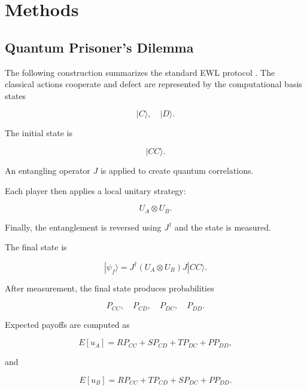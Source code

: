 \section{Methods}

\subsection{Quantum Prisoner's Dilemma}

The following construction summarizes the standard EWL protocol \cite{ewl}. The classical actions cooperate and defect are represented by the computational basis states

\begin{equation}
	|C\rangle,\quad |D\rangle.
\end{equation}

The initial state is

\begin{equation}
	|CC\rangle.
\end{equation}

An entangling operator $J$ is applied to create quantum correlations.

Each player then applies a local unitary strategy:

\begin{equation}
	U_A \otimes U_B.
\end{equation}

Finally, the entanglement is reversed using $J^\dagger$ and the state is measured.

The final state is

\begin{equation}
	|\psi_f\rangle
	=
	J^\dagger
	(U_A \otimes U_B)
	J
	|CC\rangle.
\end{equation}

After measurement, the final state produces probabilities

\begin{equation}
	P_{CC},\quad P_{CD},\quad P_{DC},\quad P_{DD}.
\end{equation}

Expected payoffs are computed as

\begin{equation}
	E[u_A]
	=
	RP_{CC}
	+
	SP_{CD}
	+
	TP_{DC}
	+
	PP_{DD},
\end{equation}

and

\begin{equation}
	E[u_B]
	=
	RP_{CC}
	+
	TP_{CD}
	+
	SP_{DC}
	+
	PP_{DD}.
\end{equation}

